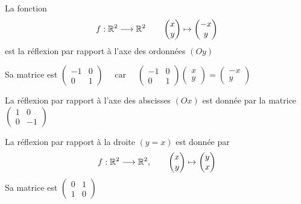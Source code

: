 \begin{frame}


La fonction
$$f : \mathbb{R}^2 \longrightarrow \mathbb{R}^2 \qquad \begin{pmatrix} x \\ y \end{pmatrix} \mapsto \begin{pmatrix} -x \\ y \end{pmatrix}$$
est la réflexion par rapport à l'axe des ordonnées $(Oy)$

\medskip

Sa matrice est \quad
$\begin{pmatrix}-1 & 0 \\ 0 & 1 \end{pmatrix}
\quad \text{ car } \quad 
\begin{pmatrix} -1 & 0 \\ 0 & 1 \end{pmatrix}
\begin{pmatrix} x \\ y \end{pmatrix}
= \begin{pmatrix} -x \\ y \end{pmatrix}$


\end{frame}


\begin{frame}

La réflexion par rapport à l'axe des abscisses $(Ox)$ est donnée par la matrice
$\begin{pmatrix} 1 & 0\\ 0 & -1 \end{pmatrix}$

\end{frame}


\begin{frame}


La réflexion par rapport à la droite $(y=x)$ est donnée par
$$f: \mathbb{R}^2 \longrightarrow \mathbb{R}^2, \qquad 
\begin{pmatrix}x\\y\end{pmatrix} \mapsto \begin{pmatrix}y\\x\end{pmatrix}$$
Sa matrice est
$\begin{pmatrix}0 & 1\\1 & 0\end{pmatrix}$

\end{frame}


